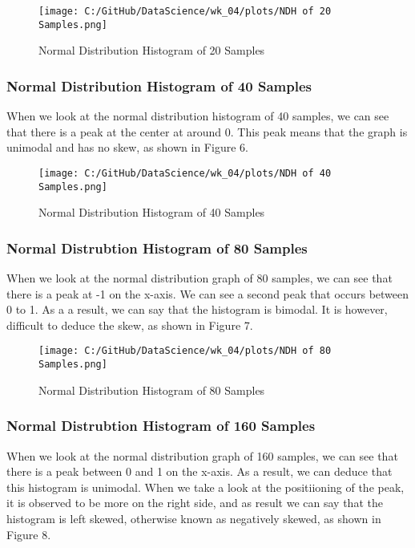 \documentclass[a4paper,twocolumn]{article}
\begin{document}
\begin{figure}[htbp] 
    \centering
    \noindent
    \texttt{[image: C:/GitHub/DataScience/wk\_04/plots/NDH of 20 Samples.png]}
    \caption{Normal Distribution Histogram of 20 Samples} 
\end{figure}

\subsubsection{Normal Distribution Histogram of 40 Samples}
When we look at the normal distribution histogram of 40 samples, we can see that there is a peak at the center at 
around 0. This peak means that the graph is unimodal and has no skew, as shown in Figure 6.


\begin{figure}[htbp] 
    \centering
    \noindent
    \texttt{[image: C:/GitHub/DataScience/wk\_04/plots/NDH of 40 Samples.png]}
    \caption{Normal Distribution Histogram of 40 Samples} 
\end{figure}

\subsubsection{Normal Distrubtion Histogram of 80 Samples}
When we look at the normal distribution graph of 80 samples, we can see that there is a peak at -1 on the x-axis.
We can see a second peak that occurs between 0 to 1. As a a result, we can say that the histogram is bimodal. It is 
however, difficult to deduce the skew, as shown in Figure 7. 

\begin{figure}[htbp] 
    \centering
    \noindent
    \texttt{[image: C:/GitHub/DataScience/wk\_04/plots/NDH of 80 Samples.png]}
    \caption{Normal Distribution Histogram of 80 Samples} 
\end{figure}

\newpage

\subsubsection{Normal Distrubtion Histogram of 160 Samples}
When we look at the normal distribution graph of 160 samples, we can see that there is a peak between 0 and 1 on the 
x-axis. As a result, we can deduce that this histogram is unimodal. When we take a look at the positiioning of the
peak, it is observed to be more on the right side, and as result we can say that the histogram is left skewed, 
otherwise known as negatively skewed, as shown in Figure 8.
\end{document}
